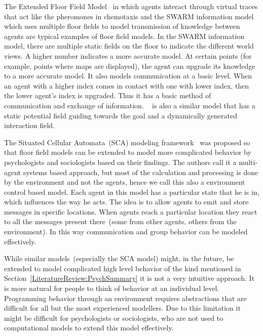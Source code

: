 The Extended Floor Field Model~\cite{nishinari2004extended} in which agents interact through virtual traces that act like the pheromones in chemotaxis and the SWARM information model~\cite{Henein:2006jq} which uses multiple floor fields to model transmission of knowledge between agents are typical examples of floor field models. In the SWARM information model, there are multiple static fields on the floor to indicate the different world views. A higher number indicates a more accurate model. At certain points (for example, points where maps are displayed), the agent can upgrade its knowledge to a more accurate model. It also models communication at a basic level. When an agent with a higher index comes in contact with one with lower index, then the lower agent's index is upgraded. Thus it has a basic method of communication and exchange of information. ~\cite{Qi:2011kv} is also a similar model that has a static potential field guiding towards the goal and a dynamically generated interaction field.

The Situated Cellular Automata~(SCA) modeling framework~\cite{Bandini:2007fa} was proposed so that floor field models can be extended to model more complicated behavior by psychologists and sociologists based on their findings. The authors call it a multi-agent systems based approach, but most of the calculation and processing is done by the environment and not the agents, hence we call this also a environment control based model. Each agent in this model has a particular state that he is in, which influences the way he acts. The idea is to allow agents to emit and store messages in specific locations. When agents reach a particular location they react to all the messages present there~(some from other agents, others from the environment). In this way communication and group behavior can be modeled effectively.

While similar models~(especially the SCA model) might, in the future, be extended to model complicated high level behavior of the kind mentioned in Section~\ref{LiteratureReview:PsychSummary} it is not a very intuitive approach. It is more natural for people to think of behavior at an individual level. Programming behavior through an environment requires abstractions that are difficult for all but the most experienced modellers. Due to this limitation it might be difficult for psychologists or sociologists, who are not used to computational models to extend this model effectively.


